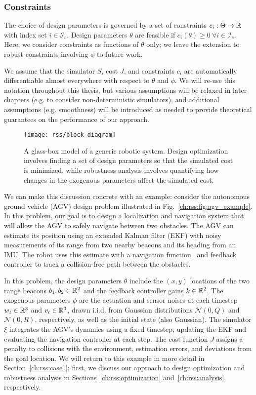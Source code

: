 \subsubsection{Constraints} The choice of design parameters is governed by a set of constraints $c_i : \Theta \mapsto \mathbb{R}$ with index set $i \in \mathcal{I}_c$. Design parameters $\theta$ are feasible if $c_i(\theta) \geq 0 \ \forall i \in \mathcal{I}_c$. Here, we consider constraints as functions of $\theta$ only; we leave the extension to robust constraints involving $\phi$ to future work.

We assume that the simulator $S$, cost $J$, and constraints $c_i$ are automatically differentiable almost everywhere with respect to $\theta$ and $\phi$. We will re-use this notation throughout this thesis, but various assumptions will be relaxed in later chapters (e.g. to consider non-deterministic simulators), and additional assumptions (e.g. smoothness) will be introduced as needed to provide theoretical guarantees on the performance of our approach.

\begin{figure}[t!]
    \centering
    \texttt{[image: rss/block\_diagram]}
    \caption{A glass-box model of a generic robotic system. Design optimization involves finding a set of design parameters so that the simulated cost is minimized, while robustness analysis involves quantifying how changes in the exogenous parameters affect the simulated cost.}
    \label{ch:rss:fig:block_diagram}
\end{figure}

We can make this discussion concrete with an example: consider the autonomous ground vehicle (AGV) design problem illustrated in Fig.~\ref{ch:rss:fig:agv_example}. In this problem, our goal is to design a localization and navigation system that will allow the AGV to safely navigate between two obstacles. The AGV can estimate its position using an extended Kalman filter (EKF) with noisy measurements of its range from two nearby beacons and its heading from an IMU. The robot uses this estimate with a navigation function~\cite{aiama} and feedback controller to track a collision-free path between the obstacles.

In this problem, the design parameters $\theta$ include the $(x, y)$ locations of the two range beacons $b_1, b_2 \in \mathbb{R}^2$ and the feedback controller gains $k \in \mathbb{R}^2$. The exogenous parameters $\phi$ are the actuation and sensor noises at each timestep $w_t \in \mathbb{R}^3$ and $v_t \in \mathbb{R}^3$, drawn i.i.d. from Gaussian distributions $\mathcal{N}(0, Q)$ and $\mathcal{N}(0, R)$, respectively, as well as the initial state (also Gaussian). The simulator $\xi$ integrates the AGV's dynamics using a fixed timestep, updating the EKF and evaluating the navigation controller at each step. The cost function $J$ assigns a penalty to collisions with the environment, estimation errors, and deviations from the goal location. We will return to this example in more detail in Section~\ref{ch:rss:case1}; first, we discuss our approach to design optimization and robustness analysis in Sections~\ref{ch:rss:optimization} and~\ref{ch:rss:analysis}, respectively.

